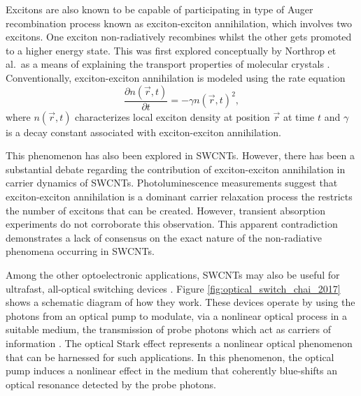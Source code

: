 Excitons are also known to be capable of participating in type of Auger recombination process known as exciton-exciton annihilation, which involves two excitons. One exciton non-radiatively recombines whilst the other gets promoted to a higher energy state. This was first explored conceptually by Northrop et al.\ as a means of explaining the transport properties of molecular crystals \cite{northrop1958electronic}. Conventionally, exciton-exciton annihilation is modeled using the rate equation
%
\begin{equation}
	\frac{\partial n(\vec{r}, t)}{\partial t} = - \gamma n(\vec{r}, t)^2,
	\label{eq:rate_eq_exc_anih}
\end{equation}
%
where $n(\vec{r}, t)$ characterizes local exciton density at position $\vec{r}$ at time $t$ and $\gamma$ is a decay constant associated with exciton-exciton annihilation.

This phenomenon has also been explored in SWCNTs. However, there has been a substantial debate regarding the contribution of exciton-exciton annihilation in carrier dynamics of SWCNTs. Photoluminescence measurements suggest that exciton-exciton annihilation is a dominant carrier relaxation process the restricts the number of excitons that can be created. However, transient absorption experiments do not corroborate this observation. This apparent contradiction demonstrates a lack of consensus on the exact nature of the non-radiative phenomena occurring in SWCNTs.

Among the other optoelectronic applications, SWCNTs may also be useful for ultrafast, all-optical switching devices \cite{chai2017ultrafast}. Figure \ref{fig:optical_switch_chai_2017} shows a schematic diagram of how they work. These devices operate by using the photons from an optical pump to modulate, via a nonlinear optical process in a suitable medium, the transmission of probe photons which act as carriers of information \cite{chai2017ultrafast}. The optical Stark effect represents a nonlinear optical phenomenon that can be harnessed for such applications. In this phenomenon, the optical pump induces a nonlinear effect in the medium that coherently blue-shifts an optical resonance detected by the probe photons.

